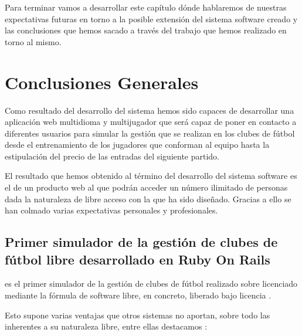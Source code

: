 

Para terminar vamos a desarrollar este capítulo dónde hablaremos de nuestras
expectativas futuras en torno a la posible extensión del sistema software creado
y las conclusiones que hemos sacado a través del trabajo que hemos realizado en
torno al mismo.

\section{Conclusiones Generales}
Como resultado del desarrollo del sistema 
hemos sido capaces de desarrollar una aplicación web multidioma y multijugador
que será capaz de poner en contacto a diferentes usuarios para simular la
gestión que se realizan en los clubes de fútbol desde el entrenamiento de los
jugadores que conforman al equipo hasta la estipulación del precio de las
entradas del siguiente partido.

El resultado que hemos obtenido al término del desarrollo del sistema software
es el de un producto web al que podrán acceder un número ilimitado de personas
dada la naturaleza de libre acceso con la que ha sido diseñado. Gracias a ello
se han colmado varias expectativas personales y profesionales.


\subsection{Primer simulador de la gestión de clubes de fútbol libre
  desarrollado en Ruby On Rails}
 es el primer simulador de la gestión de
clubes de fútbol realizado sobre  licenciado mediante la
fórmula de software libre, en concreto, liberado bajo licencia .

Esto supone varias ventajas que otros sistemas no aportan, sobre todo las
inherentes a su naturaleza libre, entre ellas destacamos \cite{fsf:what_is}:


